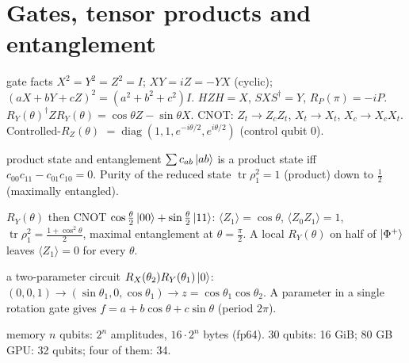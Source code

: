 \documentclass[11pt,a4paper,openany]{book}
\newcounter{wex}[chapter]
\begin{document}
\section{Gates, tensor products and entanglement}
\begin{keyres}{gate facts}
$X^2 = Y^2 = Z^2 = I$; $XY = iZ = -YX$ (cyclic); $(aX + bY + cZ)^2 = (a^2 + b^2 + c^2)I$. $HZH = X$, $SXS^\dagger = Y$,
$R_P(\pi) = -iP$. $R_Y(\theta)^\dagger ZR_Y(\theta) = \cos\theta Z - \sin\theta X$. CNOT: $Z_t \to Z_cZ_t$, $X_t \to X_t$, $X_c \to X_cX_t$.
Controlled-$R_Z(\theta)$ $= \operatorname{diag}(1, 1, e^{-i\theta/2}, e^{i\theta/2})$ (control qubit 0).
\end{keyres}
\begin{defn}{product state and entanglement}
$\sum c_{ab}\ket{ab}$ is a product state iff $c_{00}c_{11} - c_{01}c_{10} = 0$. Purity of the reduced state $\operatorname{tr}\rho_1^2 = 1$
(product) down to $\frac12$ (maximally entangled).
\end{defn}
\begin{wexample}{$R_Y(\theta)$ then CNOT}
$\cos\frac\theta2\ket{00} + \sin\frac\theta2\ket{11}$: $\langle Z_1\rangle = \cos\theta$, $\langle Z_0Z_1\rangle = 1$, $\operatorname{tr}\rho_1^2 = \frac{1 + \cos^2\theta}2$,
maximal entanglement at $\theta = \frac\pi2$. A local $R_Y(\theta)$ on half of $\ket{\Phi^+}$ leaves $\langle Z_1\rangle = 0$ for every $\theta$.
\end{wexample}
\begin{wexample}{a two-parameter circuit}
$R_X(\theta_2)R_Y(\theta_1)\ket0$: $(0,0,1) \to (\sin\theta_1, 0, \cos\theta_1) \to z = \cos\theta_1\cos\theta_2$. A parameter in a single
rotation gate gives $f = a + b\cos\theta + c\sin\theta$ (period $2\pi$).
\end{wexample}
\begin{keyres}{memory}
$n$ qubits: $2^n$ amplitudes, $16\cdot2^n$ bytes (fp64). 30 qubits: 16 GiB; 80 GB GPU: 32 qubits; four of them: 34.
\end{keyres}

\end{document}
